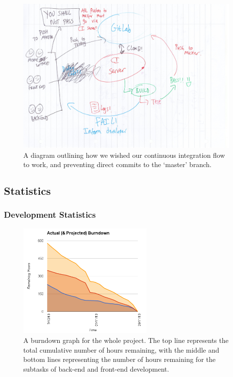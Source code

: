 \documentclass[a4paper, 11pt]{article}
\begin{document}
    \begin{figure}[H]
      \includegraphics[width=1.0\textwidth]{images/ci_flow.jpg}
      \caption{A diagram outlining how we wished our continuous integration
      flow to work, and preventing direct commits to the `master' branch.}
    \end{figure}

  \subsection{Statistics}

  \subsubsection{Development Statistics}

    \begin{figure}[H]
      \centering
      \includegraphics[width=0.6\textwidth]{images/chart1.png}
      \caption{A burndown graph for the whole project. The top line represents
        the total cumulative number of hours remaining, with the middle and
        bottom lines representing the number of hours remaining for the
      subtasks of back-end and front-end development.}
    \end{figure}
\end{document}
